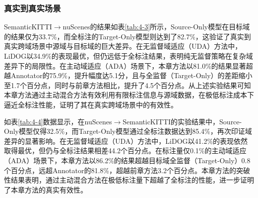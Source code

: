     \subsubsection{真实到真实场景}
    SemanticKITTI$\to$nuScenes的结果如表\ref{tab:4-3}所示，Source-Only模型在目标域的结果仅为33.7\%，而全标注的Target-Only模型则达到了82.7\%，这验证了真实到真实跨域场景中源域与目标域的巨大差异。在无监督域适应（UDA）方法中，LiDOG以34.9\%的表现最优，但仍远低于全标注结果，表明纯无监督策略在复杂域差异下的局限性。在主动域适应（ADA）场景下，本章方法以81.0\%的结果显著超越Annotator的75.9\%，提升幅度达5.1分，且与全监督（Target-Only）的差距缩小至1.7个百分点，同时与前章方法相比，提升了4.5个百分点。从上述实验结果可知本章方法通过主动混合方法有效利用有限标注信息与源域数据，在极低标注成本下逼近全标注性能，证明了其在真实跨域场景中的有效性。
    
    如表\ref{tab:4-4}数据显示，在nuScenes$\to$SemanticKITTI的实验结果中，Source-Only模型仅得32.5\%，而Target-Only模型通过全标注数据达到85.4\%，再次印证域差异的显著影响。在无监督域适应（UDA）方法中，LiDOG以41.2\%的表现依然取得最优，但仍与全标注结果相差44.2个百分点。在标注量仅0.1\%的主动域适应（ADA）场景下，本章方法以86.2\%的结果超越目标域全监督（Target-Only）0.8个百分点，远超Annotator的81.8\%，超越前章方法3.2个百分点。本章方法的突破性结果表明，通过主动混合方法在极低标注量下超越了全标注的性能，进一步证明了本章方法的真实有效性。
    

